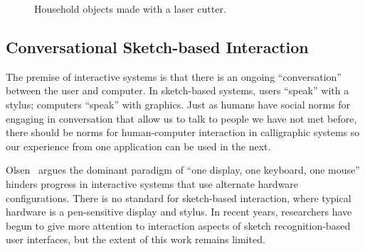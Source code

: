 \documentclass[12pt]{article}
\begin{document}
\begin{figure}
\centering 
{}
\hspace{1cm} 
\caption{Household objects made with a laser cutter.}
\label{fig:flat}
\end{figure}

\subsection{Conversational Sketch-based Interaction}

The premise of interactive systems is that there is an ongoing
``conversation'' between the user and computer. In sketch-based
systems, users ``speak'' with a stylus; computers ``speak'' with
graphics. Just as humans have social norms for engaging in
conversation that allow us to talk to people we have not met before,
there should be norms for human-computer interaction in calligraphic
systems so our experience from one application can be used in the
next.

Olsen~\cite{olsen-ui-research} argues the dominant paradigm of ``one
display, one keyboard, one mouse'' hinders progress in interactive
systems that use alternate hardware configurations. There is no
standard for sketch-based interaction, where typical hardware is a
pen-sensitive display and stylus. In recent years, researchers have
begun to give more attention to interaction aspects of sketch
recognition-based user interfaces, but the extent of this work remains
limited.
\end{document}
